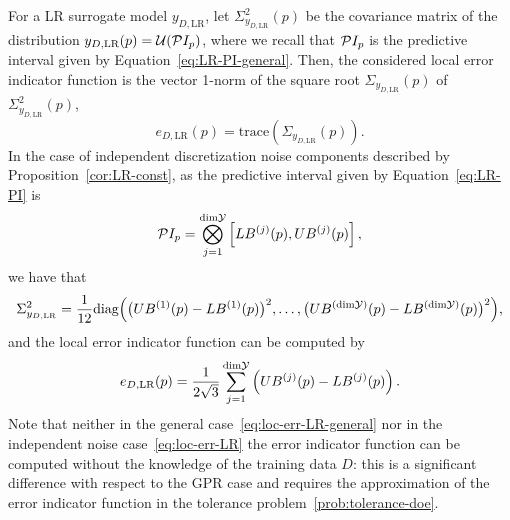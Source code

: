 For a LR surrogate model $y_{D,\text{LR}}$, let $\Sigma^2_{y_{D,\text{LR}}}(p)$ be the covariance matrix of the distribution $y_{D,\text{LR}}(p) = \mathcal U (\mathcal PI_p)$, where we recall that $\mathcal PI_p$ is the predictive interval given by Equation~\eqref{eq:LR-PI-general}.\newline
Then, the considered local error indicator function is the vector 1-norm of the square root $\Sigma_{y_{D,\text{LR}}}(p)$ of $\Sigma^2_{y_{D,\text{LR}}}(p)$,
\begin{equation} \label{eq:loc-err-LR-general}
    e_{D, \text{LR}}(p) = \text{trace}(\Sigma_{y_{D,\text{LR}}}(p)).
\end{equation}
In the case of independent discretization noise components described by Proposition~\ref{cor:LR-const}, as the predictive interval given by Equation~\eqref{eq:LR-PI} is
\begin{equation*}
    \mathcal PI_p = \bigotimes_{j=1}^{\text{dim}\mathcal Y} \left[ LB^{(j)}(p), UB^{(j)}(p)\right],
\end{equation*}
we have that
\[
    \Sigma^2_{y_{D,\text{LR}}} = \frac{1}{12} \text{diag} \Big ( \big( UB^{(1)}(p) - LB^{(1)}(p)\big)^2, \dots,\big( UB^{(\text{dim}\mathcal Y)}(p) - LB^{(\text{dim}\mathcal Y)}(p) \big)^2 \Big),
\] and the local error indicator function can be computed by 
\begin{equation} \label{eq:loc-err-LR}
    e_{D, \text{LR}}(p) = \frac{1}{2\sqrt{3}} \sum_{j=1}^{\text{dim}\mathcal Y} \left( UB^{(j)}(p) - LB^{(j)}(p) \right).
\end{equation}
Note that neither in the general case~\eqref{eq:loc-err-LR-general} nor in the independent noise case~\eqref{eq:loc-err-LR} the error indicator function can be computed without the knowledge of the training data $D$: this is a significant difference with respect to the GPR case and requires the approximation of the error indicator function in the tolerance problem~\eqref{prob:tolerance-doe}.\medbreak

